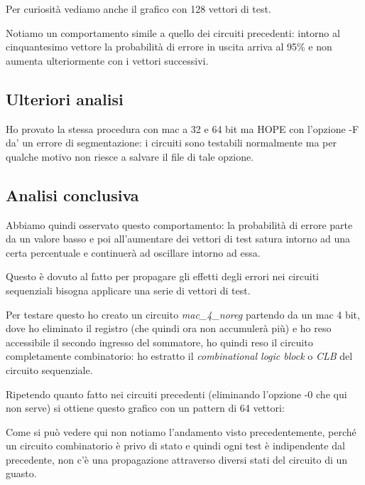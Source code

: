 \documentclass[12pt, letterpaper]{article}
\begin{document}


Per curiosità vediamo anche il grafico con 128 vettori di test.



Notiamo un comportamento simile a quello dei circuiti precedenti: intorno al cinquantesimo vettore la probabilità di errore in uscita arriva al 95\% e non aumenta ulteriormente con i vettori successivi.

\subsection{Ulteriori analisi}

Ho provato la stessa procedura con mac a 32 e 64 bit ma HOPE con l'opzione -F da' un errore di segmentazione: i circuiti sono testabili normalmente ma per qualche motivo non riesce a salvare il file di tale opzione.

\subsection{Analisi conclusiva}

Abbiamo quindi osservato questo comportamento: la probabilità di errore parte da un valore basso e poi all'aumentare dei vettori di test satura intorno ad una certa percentuale e continuerà ad oscillare intorno ad essa.

Questo è dovuto al fatto per propagare gli effetti degli errori nei circuiti sequenziali bisogna applicare una serie di vettori di test.

Per testare questo ho creato un circuito \textit{mac\_4\_noreg} partendo da un mac 4 bit, dove ho eliminato il registro (che quindi ora non accumulerà più) e ho reso accessibile il secondo ingresso del sommatore, ho quindi reso il circuito completamente combinatorio: ho estratto il \textit{combinational logic block} o \textit{CLB} del circuito sequenziale.

Ripetendo quanto fatto nei circuiti precedenti (eliminando l'opzione -0 che qui non serve) si ottiene questo grafico con un pattern di 64 vettori:



Come si può vedere qui non notiamo l'andamento visto precedentemente, perché un circuito combinatorio è privo di stato e quindi ogni test è indipendente dal precedente, non c'è una propagazione attraverso diversi stati del circuito di un guasto.
\end{document}
